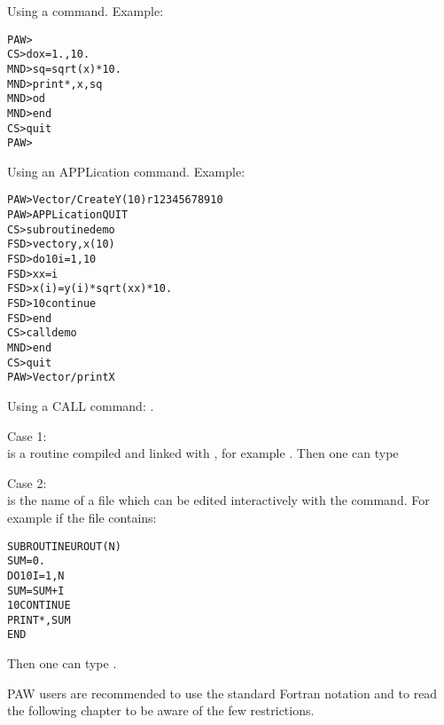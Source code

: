 \begin{UL}
\item Using a \COMIS{} command. Example:
\begin{alltt}
PAW > \COMIS{}
CS >   do x=1.,10.
MND>      sq=sqrt(x)*10.
MND>      print *,x,sq
MND>   od
MND>   end
CS > quit
PAW >
\end{alltt}
\item Using an APPLication command. Example:
\begin{alltt}
PAW > Vector/Create Y(10) r 1 2 3 4 5 6 7 8 9 10
PAW > APPLication \COMIS{} QUIT
CS >     subroutine demo
FSD>     vector y, x(10)
FSD>     do 10 i=1,10
FSD>       xx=i
FSD>       x(i)=y(i)*sqrt(xx)*10.
FSD>  10 continue
FSD>     end
CS >     call demo
MND>     end
CS > quit
PAW> Vector/print X
\end{alltt}
\item Using a CALL command: .
\begin{UL}
\item Case 1:\\
   is a routine compiled and linked with \PAW,
  for example .
  Then one can type 
\item Case 2:\\
   is the name of a file which can be edited interactively
  with the \PAW{}  command. For example if the file 
  contains:
\begin{alltt}
      SUBROUTINE UROUT(N)
      SUM=0.
      DO 10 I=1,N
        SUM=SUM+I
  10  CONTINUE
      PRINT *,SUM
      END
\end{alltt}
Then one can type .
\end{UL}
\end{UL}
 
PAW users are recommended to use the standard Fortran notation
and to read the following chapter to be aware of the few \COMIS{}
restrictions.





